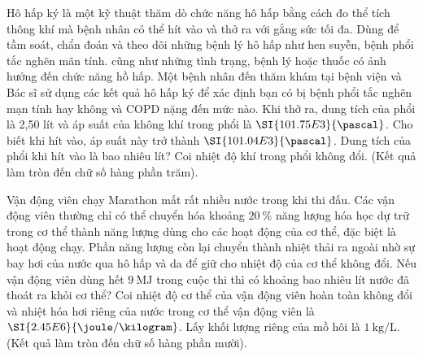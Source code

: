 \begin{ex}
	Hô hấp ký là một kỹ thuật thăm dò chức năng hô hấp bằng cách đo thể tích thông khí mà bệnh nhân có thể hít vào và thở ra với gắng sức tối đa. Dùng để tầm soát, chẩn đoán và theo dõi những bệnh lý hô hấp như hen suyễn, bệnh phổi tắc nghẽn mãn tính. cũng như những tình trạng, bệnh lý hoặc thuốc có ảnh hưởng đến chức năng hồ hấp. Một bệnh nhân đến thăm khám tại bệnh viện và Bác sĩ sử dụng các kết quả hô hấp ký để xác định bạn có bị bệnh phổi tắc nghẽn mạn tính hay không và COPD nặng đến mức nào. Khi thở ra, dung tích của phổi là 2,50 lít và áp suất của không khí trong phổi là $\SI{101.75E3}{\pascal}$. Cho biết khi hít vào, áp suất này trở thành $\SI{101.04E3}{\pascal}$. Dung tích của phổi khi hít vào là bao nhiêu lít? Coi nhiệt độ khí trong phổi không đổi. (Kết quả làm tròn đến chữ số hàng phần trăm).
\end{ex}
\begin{ex}
	Vận động viên chạy Marathon mất rất nhiều nước trong khi thi đấu. Các vận động viên thường chỉ có thể chuyển hóa khoảng $\SI{20}{\percent}$ năng lượng hóa học dự trữ trong cơ thể thành năng lượng dùng cho các hoạt động của cơ thể, đặc biệt là hoạt động chạy. Phần năng lượng còn lại chuyển thành nhiệt thải ra ngoài nhờ sự bay hơi của nước qua hô hấp và da để giữ cho nhiệt độ của cơ thể không đổi. Nếu vận động viên dùng hết $\SI{9}{\mega\joule}$ trong cuộc thi thì có khoảng bao nhiêu lít nước đã thoát ra khỏi cơ thể? Coi nhiệt độ cơ thể của vận động viên hoàn toàn không đổi và nhiệt hóa hơi riêng của nước trong cơ thể vận động viên là $\SI{2.45E6}{\joule/\kilogram}$. Lấy khối lượng riêng của mồ hôi là $\SI{1}{\kilogram/\liter}$. (Kết quả làm tròn đến chữ số hàng phần mười).
	\loigiai{
		
	}
\end{ex}
